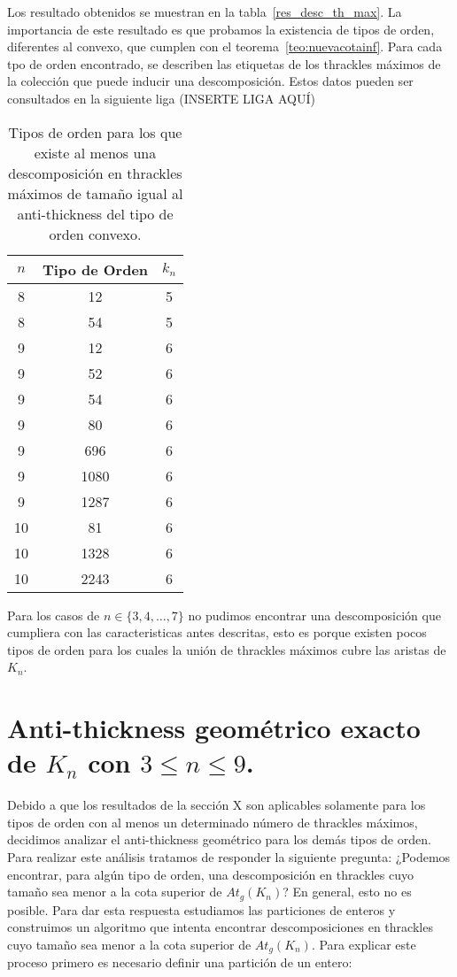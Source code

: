   Los resultado obtenidos se muestran en la tabla~\ref{res_desc_th_max}. La
  importancia de este resultado es que probamos la existencia de tipos de
  orden, diferentes al convexo, que cumplen con el
  teorema~\ref{teo:nuevacotainf}. Para cada tpo de orden encontrado, se
  describen las etiquetas de los thrackles máximos de la colección que puede
  inducir una descomposición. Estos datos pueden ser consultados en la
  siguiente liga (INSERTE LIGA AQUÍ)

  \begin{table}[t]
    \centering
    \begin{tabular}{|c|c|c|}
      \hline
      $n$   & Tipo de Orden & $k_n$ \\ \hline\hline
      8 & 12   & 5  \\
      8 & 54   & 5  \\ \hline
      9 & 12   & 6  \\
      9 & 52   & 6  \\
      9 & 54   & 6  \\
      9 & 80   & 6  \\
      9 & 696  & 6  \\
      9 & 1080 & 6  \\
      9 & 1287 & 6  \\ \hline
     10 & 81   & 6  \\
     10 & 1328 & 6  \\
     10 & 2243 & 6  \\ \hline
    \end{tabular}
    \caption{Tipos de orden para los que existe al menos una descomposición en
    thrackles máximos de tamaño igual al anti-thickness del tipo de orden
    convexo.}
    \label{table:res_desc_th_max}
  \end{table}

  Para los casos de $n \in \{3,4,\dots,7\}$ no pudimos encontrar una
  descomposición que cumpliera con las caracteristicas antes descritas, esto es
  porque existen pocos tipos de orden para los cuales la unión de thrackles
  máximos cubre las aristas de $K_n$.

  \section{Anti-thickness geométrico exacto de $K_n$ con $3\leq n \leq 9$.}

    Debido a que los resultados de la sección X son aplicables solamente para los tipos de orden con al menos un determinado número de thrackles máximos, decidimos analizar el anti-thickness geométrico para los demás tipos de orden. Para realizar este análisis tratamos de responder la siguiente pregunta: ¿Podemos encontrar, para algún tipo de orden, una descomposición en thrackles cuyo tamaño sea menor a la cota superior de $At_g(K_n)$? En general, esto no es posible. Para dar esta respuesta estudiamos las particiones de enteros y construimos un algoritmo que intenta encontrar descomposiciones en thrackles cuyo tamaño sea menor a la cota superior de $At_g(K_n)$. Para explicar este proceso primero es necesario definir una partición de un entero:


